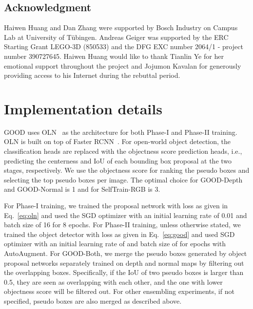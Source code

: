 \documentclass{article} \usepackage{iclr2023_conference,times}
\begin{document}
\subsection*{Acknowledgment}
Haiwen Huang and Dan Zhang were supported by Bosch Industry on Campus Lab at University of Tübingen. Andreas Geiger was supported by the ERC Starting Grant LEGO-3D (850533) and the DFG EXC number 2064/1 - project number 390727645. Haiwen Huang would like to thank Tianlin Ye for her emotional support throughout the project and Jojumon Kavalan for generously providing access to his Internet during the rebuttal period. 




\newpage


\appendix



\section{Implementation details}\label{appendix: implementation}

GOOD uses OLN~\citep{kim_learning_2021} as the architecture for both Phase-I and Phase-II training. OLN is built on top of Faster RCNN~\citep{ren_faster_2015}.
For open-world object detection, the classification heads are replaced with the objectness score prediction heads, i.e., predicting the centerness and IoU of each bounding box proposal at the two stages, respectively. We use the objectness score  for ranking the pseudo boxes and selecting the top  pseudo boxes per image.
The optimal  choice for GOOD-Depth and GOOD-Normal is 1 and for SelfTrain-RGB is 3.

For Phase-I training, we trained the proposal network with loss as given in Eq.~\ref{eq:oln} and used the SGD optimizer with an initial learning rate of 0.01 and batch size of 16 for 8 epochs. 
For Phase-II training, unless otherwise stated, we trained the object detector with loss as given in Eq.~\ref{eq:good} and used SGD optimizer with an initial learning rate of  and batch size of  for  epochs with AutoAugment.
For GOOD-Both, we merge the pseudo boxes generated by object proposal networks separately trained on depth and normal maps by filtering out the overlapping boxes. Specifically, if the IoU of two pseudo boxes is larger than 0.5, they are seen as overlapping with each other, and the one with lower objectness score will be filtered out. For other ensembling  experiments, if not specified, pseudo boxes are also merged as described above.
\end{document}
